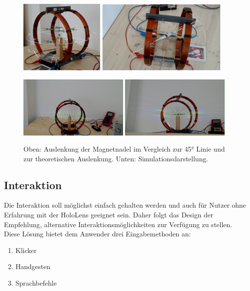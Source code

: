 \begin{figure}[h!]
	\centering
	\includegraphics[width=0.37\textwidth]{images/HL/45DegCut.jpg}
	\hspace{0.01\textwidth}
	\includegraphics[width=0.57\textwidth]{images/HL/compass.jpg}
	
	\vspace{0.01\textwidth}
	
	\includegraphics[width=0.48\textwidth]{images/HL/simulation.jpg}
	\hspace{0.01\textwidth}
	\includegraphics[width=0.48\textwidth]{images/HL/simu2.jpg}
	\caption{Oben: Auslenkung der Magnetnadel im Vergleich zur 45° Linie und zur theoretischen Auslenkung. Unten: Simulationsdarstellung.}
	\label{img:hl_ss}
\end{figure}


\subsection{Interaktion}
\label{sec-4-4}
Die Interaktion soll möglichst einfach gehalten werden und auch für Nutzer ohne Erfahrung mit der HoloLens geeignet sein. Daher folgt das Design der Empfehlung, alternative Interaktionsmöglichkeiten zur Verfügung zu stellen. Diese Lösung bietet dem Anwender drei Eingabemethoden an:
\begin{enumerate}
	\setlength{\itemsep}{-5pt}
	\item Klicker
	\item Handgesten
	\item Sprachbefehle
\end{enumerate}

